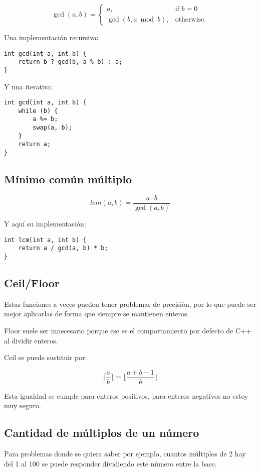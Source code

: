 \documentclass[11pt]{article}
\begin{document}
\[ \gcd(a, b) = \begin{cases}a,&\text{if }b = 0 \\ \gcd(b, a \bmod b),&\text{otherwise.}\end{cases} \]

Una implementación recursiva:

\begin{lstlisting}
int gcd(int a, int b) {
    return b ? gcd(b, a % b) : a;
}
\end{lstlisting}

Y una iterativa:

\begin{lstlisting}
int gcd(int a, int b) {
    while (b) {
        a %= b;
        swap(a, b);
    }
    return a;
}
\end{lstlisting}

\subsection{Mínimo común múltiplo}

\[ lcm(a, b) = \frac{a \cdot b}{\gcd(a, b)} \]

Y aquí su implementación:

\begin{lstlisting}
int lcm(int a, int b) {
    return a / gcd(a, b) * b;
}
\end{lstlisting}

\subsection{Ceil/Floor}

Estas funciones a veces pueden tener problemas de precisión, por lo que puede ser mejor aplicarlas de forma que siempre se mantienen enteros.

Floor suele ser innecesario porque ese es el comportamiento por defecto de C++ al dividir enteros.

Ceil se puede sustituir por:

\[ \lceil \frac{a}{b} \rceil = \lfloor \frac{a + b - 1}{b} \rfloor \]

Esta igualdad se cumple para enteros positivos, para enteros negativos no estoy muy seguro.

\subsection{Cantidad de múltiplos de un número}

Para problemas donde se quiera saber por ejemplo, cuantos múltiplos de 2 hay del 1 al 100 se puede responder dividiendo este número entre la base.
\end{document}
